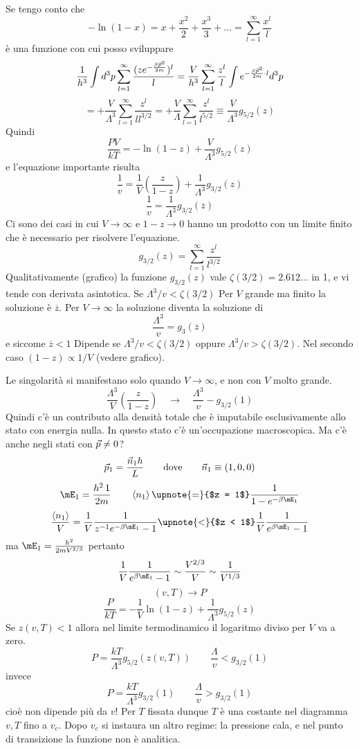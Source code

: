 \documentclass[../MeccanicaStatistica.tex]{subfiles}
\begin{document}
Se tengo conto che
\[
- \ln(1 - x) = x + \frac{x^2}{2} + \frac{x^3}{3} + \dots = \sum_{l = 1}^\infty \frac{x^l}{l}
\]
è una funzione con cui posso sviluppare
\[
\frac{1}{h^3} \int d^3 p \sum_{l = 1}^\infty \frac{(z e^{-\frac{\beta \vec p^2}{2 m}})^l}{l} = \frac{V}{h^3} \sum_{l = 1}^\infty \frac{z^l}{l} \int e^{-\frac{\beta \vec p^2}{2m} \cdot l} d^3 p
\]
\[
= + \frac{V}{\Lambda^3} \sum_{l = 1}^\infty \frac{z^l}{l l^{3/2}} = + \frac{V}{\Lambda} \sum_{l = 1}^\infty \frac{z^l}{l^{5/2}} \equiv \frac{V}{\Lambda^3} g_{5/2}(z)
\]
Quindi
\[
\frac{P V}{k T} = - \ln(1 - z) + \frac{V}{\Lambda^3} g_{5/2}(z)
\]
e l'equazione importante risulta
\[
\frac{1}{v} = \frac{1}{V} \left(\frac{z}{1 -z}\right) + \frac{1}{\Lambda^3} g_{3/2}(z)
\]
\[
\frac{1}{v} = \frac{1}{\Lambda^3} g_{3/2}(\overline z)
\]
Ci sono dei casi in cui $V \to \infty$ e $1 - z \to 0$ hanno un prodotto con un limite finito che è necessario per risolvere l'equazione.
\[
g_{3/2}(z) = \sum_{l = 1}^\infty \frac{z^l}{l^{3/2}}
\]
Qualitativamente (grafico) la funzione $g_{3/2}(z)$ vale $\zeta(3/2) = 2.612\dots$ in 1, e vi tende con derivata asintotica. Se $\Lambda^3/v < \zeta(3/2)$ Per $V$ grande ma finito la soluzione è $\overline z$. Per $V \to \infty$ la soluzione diventa la soluzione di
\[
\frac{\Lambda^3}{v} = g_3(\overline z)
\]
e siccome $\overline z < 1$
Dipende se $\Lambda^3/v < \zeta(3/2)$ oppure $\Lambda^3/v > \zeta(3/2)$. Nel secondo caso $(1 - z) \propto 1/V$ (vedere grafico).

Le singolarità si manifestano solo quando $V \to \infty$, e non con $V$ molto grande.
\[
\frac{\Lambda^3}{V} \left(\frac{z}{1 - z}\right) \quad \longrightarrow \quad \frac{\Lambda^3}{v} - g_{3/2}(1)
\]
Quindi c'è un contributo alla densità totale che è imputabile esclusivamente allo stato con energia nulla. In questo stato c'è un'occupazione macroscopica. Ma c'è anche negli stati con $\vec p \neq 0$?
\[
\vec p_1 = \frac{\vec n_1 h}{L} \qquad \text{dove} \qquad \vec n_1 \equiv (1,0,0)
\]
\[
\mE_1 = \frac{h^2 \, 1}{2 m} \qquad \avg{n_1} \upnote{=}{$z = 1$} \frac{1}{1 - e^{-\beta \mE_1}} 
\]
\[
\frac{\avg{n_1}}{V} = \frac{1}{V} \frac{1}{z^{-1} e^{-\beta \mE_1} - 1} \upnote{<}{$z < 1$} \frac{1}{V} \frac{1}{e^{\beta \mE_1} - 1} 
\]
ma $\mE_1 = \frac{h^2}{2 m V^{2/3}}$ pertanto
\[
\frac{1}{V} \frac{1}{e^{\beta \mE_1} - 1} \sim \frac{V^{2/3}}{V} \sim \frac{1}{V^{1/3}}
\]
\[
(v,T) \to P
\]
\[
\frac{P}{k T} = - \frac{1}{V} \ln(1 - z) + \frac{1}{\Lambda^3} g_{5/2}(z)
\]
Se $z(v,T) < 1$ allora nel limite termodinamico il logaritmo diviso per $V$ va a zero.
\[
P = \frac{k T}{\Lambda^3} g_{5/2}(z(v,T)) \qquad \frac{\Lambda}{v} < g_{3/2}(1)
\]
invece
\[
P = \frac{k T}{\Lambda^3} g_{3/2}(1) \qquad \frac{\Lambda}{v} > g_{3/2}(1)
\]
cioè non dipende più da $v$! Per $T$ fissata dunque $T$ è una costante nel diagramma $v,T$ fino a $v_c$. Dopo $v_c$ si instaura un altro regime: la pressione cala, e nel punto di transizione la funzione non è analitica.
\end{document}
